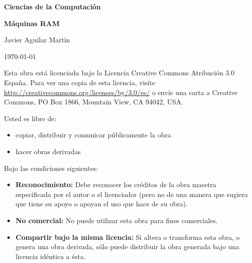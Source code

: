 \documentclass[twoside]{article}
\begin{document}
\begin{titlepage}
	\centering
	{\huge\bfseries Ciencias de la Computación \par}
	\vspace{1cm}
	{\Huge\bfseries Máquinas RAM \par}
	\vspace{1cm}
	{\Large Javier Aguilar Martín\par}
	\vspace{1cm}
	{\large \today\par}
	\vspace{1cm}

\begin{abstract}
\normalsize
 Las Máquinas de Acceso Aleatorio (RAM) proporcionan un
modelo de computación más próximo que las máquina de
Turing a los ordenadores actuales. En este trabajo se
describirá con detalle este modelo de computación y se
probará que es equivalente a GOTO.
\end{abstract}

	\vfill
	{\small Esta obra está licenciada bajo la Licencia Creative Commons Atribución 3.0 España. Para ver una copia de esta licencia, visite \url{http://creativecommons.org/licenses/by/3.0/es/} o envíe una carta a Creative Commons, PO Box 1866, Mountain View, CA 94042, USA.

\bigskip

Usted es libre de:
\begin{itemize}
 \item copiar, distribuir y comunicar públicamente la obra
\item hacer obras derivadas
\end{itemize}

Bajo las condiciones siguientes:
\begin{itemize}
 \item {\bf Reconocimiento:} Debe reconocer los créditos de la obra maestra especificada por el autor o el licenciador (pero no de una manera que sugiera que tiene su apoyo o apoyan el uso que hace de su obra).
 \item {\bf No comercial:} No puede utilizar esta obra para fines comerciales.
\item {\bf Compartir bajo la misma licencia:} Si altera o transforma esta obra, o genera una obra derivada, sólo puede distribuir la obra generada bajo una licencia idéntica a ésta.
\end{itemize}}

	
\end{titlepage}
\end{document}
